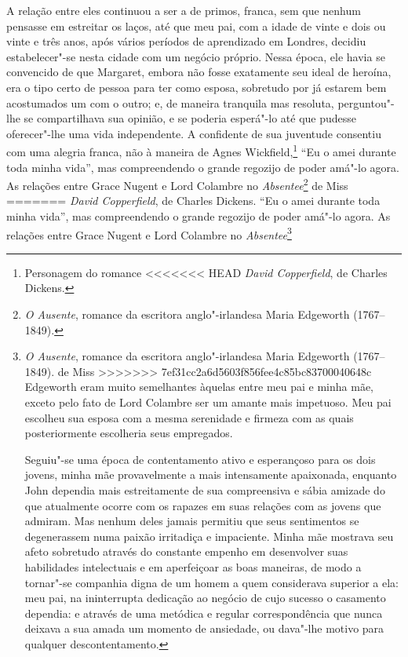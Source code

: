 {{{{{{{{{{{{{{{{{{{{{{{{{{{A relação entre eles continuou a ser a de primos, franca, sem que nenhum
pensasse em estreitar os laços, até que meu pai, com a idade de vinte e
dois ou vinte e três anos, após vários períodos de aprendizado em
Londres, decidiu estabelecer"-se nesta cidade com um negócio próprio.
Nessa época, ele havia se convencido de que Margaret, embora não fosse
exatamente seu ideal de heroína, era o tipo certo de pessoa para ter
como esposa, sobretudo por já estarem bem acostumados um com o outro; e,
de maneira tranquila mas resoluta, perguntou"-lhe se compartilhava sua
opinião, e se poderia esperá"-lo até que pudesse oferecer"-lhe uma vida
independente. A confidente de sua juventude consentiu com uma alegria
franca, não à maneira de Agnes Wickfield,\footnote{Personagem do romance
<<<<<<< HEAD
  \textit{David Copperfield}, de Charles Dickens.} ``Eu o
amei durante toda minha vida'', mas compreendendo o grande regozijo de
poder amá"-lo agora. As relações entre Grace Nugent e Lord Colambre no
\textit{Absentee}\footnote{\textit{O Ausente}, romance da escritora
  anglo"-irlandesa Maria Edgeworth (1767--1849).} de Miss
=======
  \textit{David Copperfield}, de Charles Dickens.  ``Eu o
amei durante toda minha vida'', mas compreendendo o grande regozijo de
poder amá"-lo agora. As relações entre Grace Nugent e Lord Colambre no
\textit{Absentee}\footnote{\textit{O Ausente}, romance da escritora
  anglo"-irlandesa Maria Edgeworth (1767--1849).  de Miss
>>>>>>> 7ef31cc2a6d5603f856fee4c85bc83700040648c
Edgeworth eram muito semelhantes àquelas entre meu pai e minha mãe,
exceto pelo fato de Lord Colambre ser um amante mais impetuoso. Meu pai
escolheu sua esposa com a mesma serenidade e firmeza com as quais
posteriormente escolheria seus empregados.

Seguiu"-se uma época de contentamento ativo e esperançoso para os
dois jovens, minha mãe provavelmente a mais intensamente apaixonada,
enquanto John dependia mais estreitamente de sua compreensiva e sábia
amizade do que atualmente ocorre com os rapazes em suas relações com as
jovens que admiram. Mas nenhum deles jamais permitiu que seus
sentimentos se degenerassem numa paixão irritadiça e impaciente. Minha
mãe mostrava seu afeto sobretudo através do constante empenho em
desenvolver suas habilidades intelectuais e em aperfeiçoar as boas
maneiras, de modo a tornar"-se companhia digna de um homem a quem
considerava superior a ela: meu pai, na ininterrupta dedicação ao
negócio de cujo sucesso o casamento dependia: e através de uma metódica
e regular correspondência que nunca deixava a sua amada um momento de
ansiedade, ou dava"-lhe motivo para qualquer descontentamento.

}}}}}}}}}}}}}}}}}}}}}}}}}}}}
